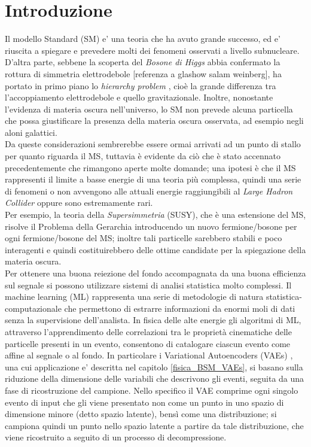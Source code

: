 %
\section{Introduzione}
\label{sec:introduzione}
%
Il modello Standard (SM) e' una teoria che ha avuto grande successo, ed e' riuscita a spiegare e prevedere molti dei fenomeni osservati a livello subnucleare. D'altra parte, sebbene la scoperta del \textit{Bosone di Higgs} \cite{Bosone_di_Higgs} abbia confermato la rottura di simmetria elettrodebole [referenza a glashow salam weinberg], ha portato in primo piano lo \textit{hierarchy problem} \cite{PG1,PG2,PG3,PG4}, cioè la grande differenza tra l'accoppiamento elettrodebole e quello gravitazionale. Inoltre, nonostante l'evidenza di materia oscura nell'universo, lo SM non prevede alcuna particella che possa giustificare la presenza della materia oscura osservata, ad esempio negli aloni galattici. \\
Da queste considerazioni sembrerebbe essere ormai arrivati ad un punto di stallo per quanto riguarda il MS, tuttavia è evidente da ciò che è stato accennato precedentemente che rimangono aperte molte domande; una ipotesi è che il MS rappresenti il limite a basse energie di una teoria più complessa, quindi una serie di fenomeni o non avvengono alle attuali energie raggiungibili al \textit{Large Hadron Collider} oppure sono estremamente rari. \\
Per esempio, la teoria della \textit{Supersimmetria} (SUSY), che è una estensione del MS, risolve il Problema della Gerarchia introducendo un nuovo fermione/bosone per ogni fermione/bosone del MS; inoltre tali particelle sarebbero stabili e poco interagenti e quindi costituirebbero delle ottime candidate per la spiegazione della materia oscura. \\
Per ottenere una buona reiezione del fondo accompagnata da una buona efficienza sul segnale si possono utilizzare  sistemi di analisi statistica molto complessi. Il machine learning (ML) rappresenta una serie di metodologie di natura statistica-computazionale che permettono di estrarre informazioni da enormi moli di dati senza la supervisione dell'analista. In fisica delle alte energie gli algoritmi di ML, attraverso l'apprendimento delle correlazioni tra le proprietà cinematiche delle particelle presenti in un evento, consentono di catalogare ciascun evento come affine al segnale o al fondo. In particolare i Variational Autoencoders (VAEs) \cite{Understanding_VAEs}, una cui applicazione e' descritta nel capitolo \ref{fisica_BSM_VAEs}, si basano sulla riduzione della dimensione delle variabili che descrivono gli eventi, seguita da una fase di ricostruzione del campione. Nello specifico il VAE comprime ogni singolo evento di input che gli viene presentato non come un punto in uno spazio di dimensione minore (detto spazio latente), bensì come una distribuzione; si campiona quindi un punto nello spazio latente a partire da tale distribuzione, che viene ricostruito a seguito di un processo di decompressione. \\
